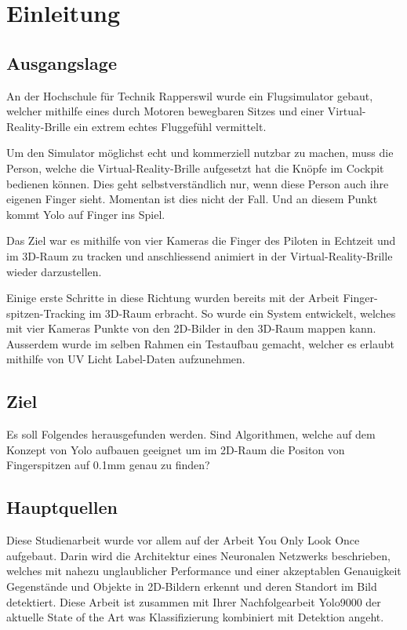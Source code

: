 \newpage
\section{Einleitung}
\subsection{Ausgangslage}
An der Hochschule für Technik Rapperswil wurde ein Flugsimulator gebaut, welcher  mithilfe eines durch Motoren bewegbaren Sitzes und einer Virtual-Reality-Brille ein extrem echtes Fluggefühl vermittelt.

Um den Simulator möglichst echt und kommerziell nutzbar zu machen, muss die Person, welche die Virtual-Reality-Brille aufgesetzt hat die Knöpfe im Cockpit bedienen können. 
Dies geht selbstverständlich nur, wenn diese Person auch ihre eigenen Finger sieht.
Momentan ist dies nicht der Fall.
Und an diesem Punkt kommt \grqq{}Yolo auf Finger\grqq{} ins Spiel.

Das Ziel war es mithilfe von vier Kameras die Finger des Piloten in Echtzeit und im 3D-Raum zu tracken und anschliessend animiert in der Virtual-Reality-Brille wieder darzustellen.

Einige erste Schritte in diese Richtung wurden bereits mit der Arbeit \grqq{}Finger-spitzen-Tracking im 3D-Raum\grqq{} \cite{TabeasFingertracking} erbracht.
So wurde ein System entwickelt, welches mit vier Kameras Punkte von den 2D-Bilder in den 3D-Raum mappen kann.
Ausserdem wurde im selben Rahmen ein Testaufbau gemacht, welcher es erlaubt mithilfe von UV Licht Label-Daten aufzunehmen.

\subsection{Ziel}
Es soll Folgendes herausgefunden werden. 
Sind Algorithmen, welche auf dem Konzept von Yolo\cite{yolo} aufbauen geeignet um im 2D-Raum die Positon von Fingerspitzen auf 0.1mm genau zu finden?

\subsection{Hauptquellen}
Diese Studienarbeit wurde vor allem auf der Arbeit \grqq{}You Only Look Once\grqq{}\cite{yolo} aufgebaut.
Darin wird die Architektur eines Neuronalen Netzwerks beschrieben, welches mit nahezu unglaublicher Performance und einer akzeptablen Genauigkeit Gegenstände und Objekte in 2D-Bildern erkennt und deren Standort im Bild detektiert.
Diese Arbeit ist zusammen mit Ihrer Nachfolgearbeit \grqq{}Yolo9000\grqq{} der aktuelle State of the Art was Klassifizierung kombiniert mit Detektion angeht.

